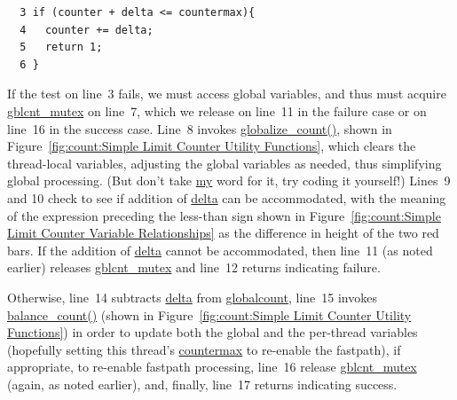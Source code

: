 	\vspace{5pt}
	\begin{minipage}[t]{\columnwidth}
	\small
	\begin{verbatim}
  3 if (counter + delta <= countermax){
  4   counter += delta;
  5   return 1;
  6 }
	\end{verbatim}
	\end{minipage}
	\vspace{5pt}
 \QuickQuizEnd

If the test on line~3 fails, we must access global variables, and thus
must acquire \url{gblcnt_mutex} on line~7, which we release on line~11
in the failure case or on line~16 in the success case.
Line~8 invokes \url{globalize_count()}, shown in
Figure~\ref{fig:count:Simple Limit Counter Utility Functions},
which clears the thread-local variables, adjusting the global variables
as needed, thus simplifying global processing.
(But don't take \url{my} word for it, try coding it yourself!)
Lines~9 and 10 check to see if addition of \url{delta} can be accommodated,
with the meaning of the expression preceding the less-than sign shown in
Figure~\ref{fig:count:Simple Limit Counter Variable Relationships}
as the difference in height of the two red bars.
If the addition of \url{delta} cannot be accommodated, then
line~11 (as noted earlier) releases \url{gblcnt_mutex} and line~12
returns indicating failure.

Otherwise, line~14 subtracts \url{delta} from \url{globalcount},
line~15 invokes \url{balance_count()} (shown in
Figure~\ref{fig:count:Simple Limit Counter Utility Functions})
in order to update both the global and the per-thread variables
(hopefully setting this thread's \url{countermax} to re-enable the
fastpath),
if appropriate, to re-enable fastpath processing, line~16 release
\url{gblcnt_mutex} (again, as noted earlier), and, finally,
line~17 returns indicating success.

